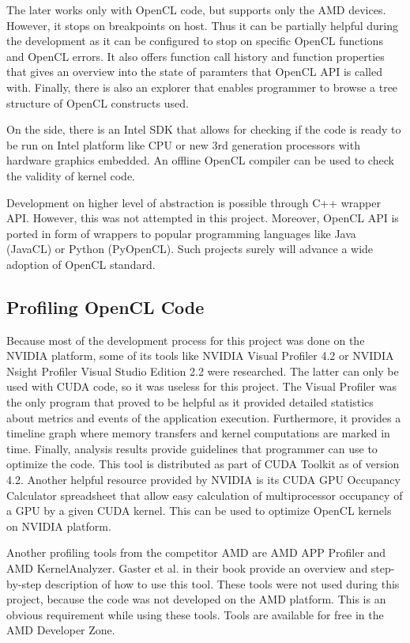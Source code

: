 The later works only with OpenCL code, but supports only the AMD devices. However, it stops on breakpoints on host. Thus it can be partially helpful during the development as it can be configured to stop on specific OpenCL functions and OpenCL errors. It also offers function call history and function properties that gives an overview into the state of paramters that OpenCL API is called with. Finally, there is also an explorer that enables programmer to browse a tree structure of OpenCL constructs used.

On the side, there is an Intel SDK that allows for checking if the code is ready to be run on Intel platform like CPU or new 3rd generation processors with hardware graphics embedded. An offline OpenCL compiler can be used to check the validity of kernel code. 

Development on higher level of abstraction is possible through C++ wrapper API.\cite{khronos2012openclcppspec} However, this was not attempted in this project. Moreover, OpenCL API is ported in form of wrappers to popular programming languages like Java (JavaCL) or Python (PyOpenCL). Such projects surely will advance a wide adoption of OpenCL standard. 

\subsection{Profiling OpenCL Code}
Because most of the development process for this project was done on the NVIDIA platform, some of its tools like NVIDIA Visual Profiler 4.2 or NVIDIA Nsight Profiler Visual Studio Edition 2.2 were researched.\cite{nvidia2012nsight} The latter can only be used with CUDA code, so it was useless for this project. The Visual Profiler was the only program that proved to be helpful as it provided detailed statistics about metrics and events of the application execution. Furthermore, it provides a timeline graph where memory transfers and kernel computations are marked in time. Finally, analysis results provide guidelines that programmer can use to optimize the code. This tool is distributed as part of CUDA Toolkit as of version 4.2. 
Another helpful resource provided by NVIDIA is its CUDA GPU Occupancy Calculator spreadsheet that allow easy calculation of multiprocessor occupancy of a GPU by a given CUDA kernel. This can be used to optimize OpenCL kernels on NVIDIA platform.

Another profiling tools from the competitor AMD are AMD APP Profiler\cite{amd2012appprof} and AMD KernelAnalyzer\cite{amd2012kernelanalyzer}. Gaster et al. in their book\cite{gaster2011heterogeneous} provide an overview and step-by-step description of how to use this tool. These tools were not used during this project, because the code was not developed on the AMD platform. This is an obvious requirement while using these tools. Tools are available for free in the AMD Developer Zone.